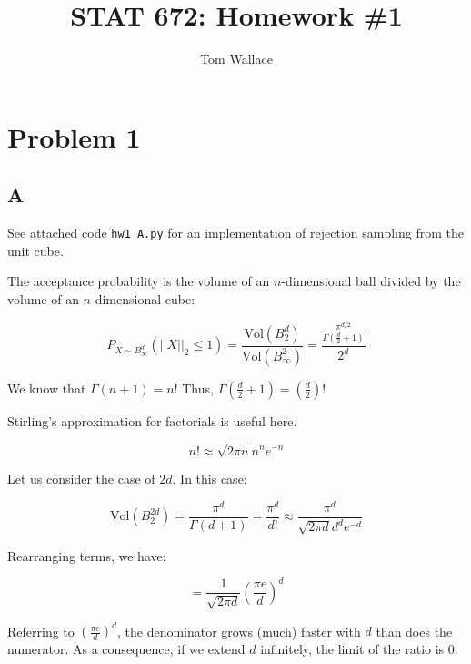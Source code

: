\documentclass{article}
\title{STAT 672: Homework \#1}
\author{Tom Wallace}
\begin{document}
\maketitle

\section*{Problem 1}

\subsection*{A}

See attached code \texttt{hw1\_A.py} for an implementation of rejection sampling
from the unit cube.

\smallskip

The acceptance probability is the volume of an $n$-dimensional ball divided by
the volume of an $n$-dimensional cube:

\begin{equation}
P_{X \sim B^d_\infty}(||X||_2 \leq 1) =
\frac{\mathrm{Vol}(B^d_2)}{\mathrm{Vol}(B^2_\infty)}
= \frac{\frac{\pi ^ {d/2}}{\Gamma(\frac{d}{2} + 1)}}{2^d}
\end{equation}

We know that $\Gamma (n+1) = n!$ Thus, $\Gamma (\frac{d}{2} + 1) = (\frac{d}{2})!$

\smallskip

Stirling's approximation for factorials is useful here.

\begin{equation}
n! \approx \sqrt{2 \pi n}n^ne^{-n}
\end{equation}

Let us consider the case of $2d$. In this case:

\begin{equation}
\mathrm{Vol}(B^{2d}_2) = \frac{\pi ^ d}{\Gamma(d + 1)} = \frac{\pi^d}{d!}
\approx \frac{\pi^d}{\sqrt{2\pi d}d^de^{-d}}
\end{equation}

Rearranging terms, we have:

\begin{equation}
= \frac{1}{\sqrt{2\pi d}} \left( \frac{\pi e}{d} \right)^d
\end{equation}

Referring to $ \left( \frac{\pi e}{d} \right)^d$, the denominator grows (much) faster with $d$ than does the
numerator. As a consequence, if we extend $d$ infinitely, the limit of the ratio is 0.
\end{document}
